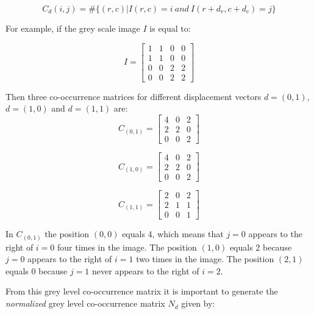 \begin{equation}
    C_{d}(i,j) = \# \{(r,c) | I(r,c)=i\  \textit{and} \  I(r+d_r, c+d_c)=j \} 
\end{equation}

For example, if the grey scale image $I$ is equal to:

\begin{equation}
I=
    \begin{bmatrix}
    1&1&0&0\\
    1&1&0&0\\
    0&0&2&2\\
    0&0&2&2
    \end{bmatrix} 
\end{equation}{}


Then three co-occurrence matrices for different displacement vectors $d=(0,1)$, $d=(1,0)$ and $d=(1,1)$ are:
\begin{equation}
    C_{(0,1)}=
    \begin{bmatrix}
    4&0&2\\
    2&2&0\\
    0&0&2
    \end{bmatrix}
\end{equation}{}

\begin{equation}
C_{(1,0)}=
    \begin{bmatrix}
    4&0&2\\
    2&2&0\\
    0&0&2
    \end{bmatrix}
\end{equation}{}

\begin{equation}
C_{(1,1)}=
    \begin{bmatrix}
    2&0&2\\
    2&1&1\\
    0&0&1
    \end{bmatrix}
\end{equation}{}

In $C_{(0,1)}$ the position $(0,0)$ equals 4, which means that $j=0$ appears to the right of $i=0$ four times in the image. The position $(1,0)$ equals 2 because $j=0$ appears to the right of $i=1$ two times in the image. The position $(2,1)$ equals 0 because $j=1$ never appears to the right of $i=2$.

From this grey level co-occurrence matrix it is important to generate the \textit{normalized} grey level co-occurrence matrix $N_d$ given by:

